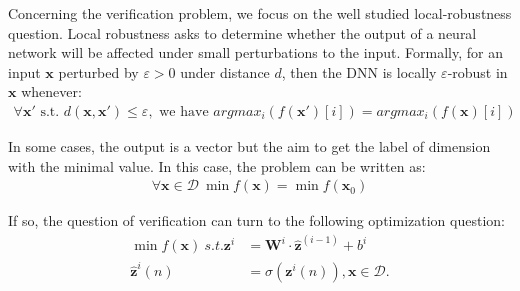 \documentclass[a4paper,UKenglish,cleveref, autoref, thm-restate]{lipics-v2021}
\newcommand{\vx}{\boldsymbol{x}}
\newcommand{\vb}{\boldsymbol{bias}}
\begin{document}
	
	
	\iffalse
	and the $i$-th hidden layer is a vector in $\mathbb{R}^{d_i}$, 
	and the output layer is a vector in $\mathbb{R}^{d'}$ or a scale. 
	The weights, bias and activation functions decide propagate the from previous to the next layer. In formula, from layer $l_{i-1}$ to layer $l_{i}$, the weight 
	$\boldsymbol{W}^i$ is matrix of $d_i\times d_{i-1}$, 
	the bias is a vector $\vb^i$ in $\mathbb{R}^{d_i}$, and the activation function 
	is $\sigma$, then  if the $i-1$-th layer is $\hat{\boldsymbol{z}}^{(i-1)}$, 
	then the value of $i$-th layer is computed by: 
	\begin{align*}
		{\boldsymbol{z}}^{i} &= \boldsymbol{W}^i\cdot \hat{\boldsymbol{z}}^{(i-1)}+ \vb^i\\
		\hat{\boldsymbol{z}}^{i}(n) &= \sigma({\boldsymbol{z}}^i(n)).
	\end{align*} The vector $\hat{\boldsymbol{z}}$ is called post-activation values, and $\boldsymbol{z}$ is called pre-activation values, and $\boldsymbol{z}^{(i)}_j$ is used to call the $j$-th neuron in the $i$-th layer. In our style, we also call neurons \emph{nodes} and use $a,b,c,d$ to denote them. We use $W_{ab}$ to denote the weight from neuron $b$ to $a$. We use $\boldsymbol{x}$ to denote the vector of input and  $f(\boldsymbol{x})$ to denote the output.
	\fi
	
	\medskip
	
	Concerning the verification problem, we focus on the well studied local-robustness question. Local robustness asks to determine whether the output of a neural network will be affected under small perturbations to the input. 
	Formally, for an input $\vx$ perturbed by $\varepsilon >0$ under distance $d$, then the DNN is locally $\varepsilon$-robust in $\vx$ whenever:
	\begin{align*}
		\forall \boldsymbol{x'} \text{ s.t. } d(\vx,\vx')\leq \varepsilon, \text{ we have }  
		argmax_i (f(\boldsymbol{x'})[i]) = argmax_i(f(\boldsymbol{x})[i])
	\end{align*} 
	
	\iffalse
	In some cases, the output is a vector but the aim to get the label of dimension with the minimal value. In this case, the problem can be written as:\begin{align*}
		\forall \boldsymbol{x} \in\mathcal{D} \  \min f(\boldsymbol{x}) = \min f(\boldsymbol{x}_0)
	\end{align*}
	
	If so, the question of verification can turn to the following optimization question: \begin{align*}
		\min f(\boldsymbol{x}) \ s.t. {\boldsymbol{z}}^{i} &= \boldsymbol{W}^i\cdot \hat{\boldsymbol{z}}^{(i-1)}+ b^i\\
		\hat{\boldsymbol{z}}^{i}(n) &= \sigma({\boldsymbol{z}}^i(n)), \boldsymbol{x}\in\mathcal{D}.
	\end{align*}
	
\end{document}
